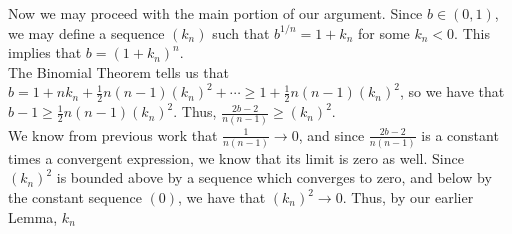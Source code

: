 \documentclass[paper=a4, fontsize=11pt]{scrartcl} %
\numberwithin{equation}{section} %
\numberwithin{figure}{section} %
\numberwithin{table}{section} %
\begin{document}
Now we may proceed with the main portion of our argument. Since $b \in (0,1)$, we may define a sequence $(k_n)$ such that $b^{1/n} = 1 + k_n$ for some $k_n < 0$. This implies that $b = (1 + k_n)^n$.\\

The Binomial Theorem tells us that $b = 1 + n k_n + \frac{1}{2} n (n-1) (k_n)^2 + \cdots \geq 1 + \frac{1}{2} n (n-1) (k_n)^2$, so we have that $b - 1 \geq \frac{1}{2} n (n-1) (k_n)^2$. Thus, $\frac{2b - 2}{n(n-1)} \geq (k_n)^2$.\\

We know from previous work that $\frac{1}{n(n-1)} \rightarrow 0$, and since $\frac{2b - 2}{n(n-1)}$ is a constant times a convergent expression, we know that its limit is zero as well. Since $(k_n)^2$ is bounded above by a sequence which converges to zero, and below by the constant sequence $(0)$, we have that $(k_n)^2 \rightarrow 0$. Thus, by our earlier Lemma, $k_n$	
\end{document}
